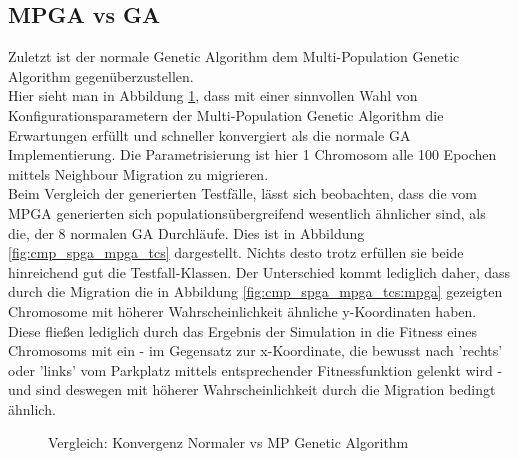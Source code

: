 \documentclass[12pt,a4paper]{article}
\begin{document}
\subsection{MPGA vs GA}
Zuletzt ist der normale Genetic Algorithm dem Multi-Population Genetic Algorithm gegenüberzustellen.\\
Hier sieht man in Abbildung \ref{fig:cmp_spga_mpga_fit}, dass mit einer sinnvollen Wahl von Konfigurationsparametern der Multi-Population Genetic Algorithm die Erwartungen erfüllt und schneller konvergiert als die normale GA Implementierung. Die Parametrisierung ist hier 1 Chromosom alle 100 Epochen mittels Neighbour Migration zu migrieren.\\
Beim Vergleich der generierten Testfälle, lässt sich beobachten, dass die vom MPGA generierten sich populationsübergreifend wesentlich ähnlicher sind, als die, der 8 normalen GA Durchläufe. Dies ist in Abbildung \ref{fig:cmp_spga_mpga_tcs} dargestellt. Nichts desto trotz erfüllen sie beide hinreichend gut die Testfall-Klassen. Der Unterschied kommt lediglich daher, dass durch die Migration die in Abbildung \ref{fig:cmp_spga_mpga_tcs:mpga} gezeigten Chromosome mit höherer Wahrscheinlichkeit ähnliche y-Koordinaten haben. Diese fließen lediglich durch das Ergebnis der Simulation in die Fitness eines Chromosoms mit ein - im Gegensatz zur x-Koordinate, die bewusst nach 'rechts' oder 'links' vom Parkplatz mittels entsprechender Fitnessfunktion gelenkt wird - und sind deswegen mit höherer Wahrscheinlichkeit durch die Migration bedingt ähnlich.
\begin{figure}
\label{fig:cmp_spga_mpga_fit}
\centering
{}
\caption{Vergleich: Konvergenz Normaler vs MP Genetic Algorithm}
\end{figure}
\end{document}
